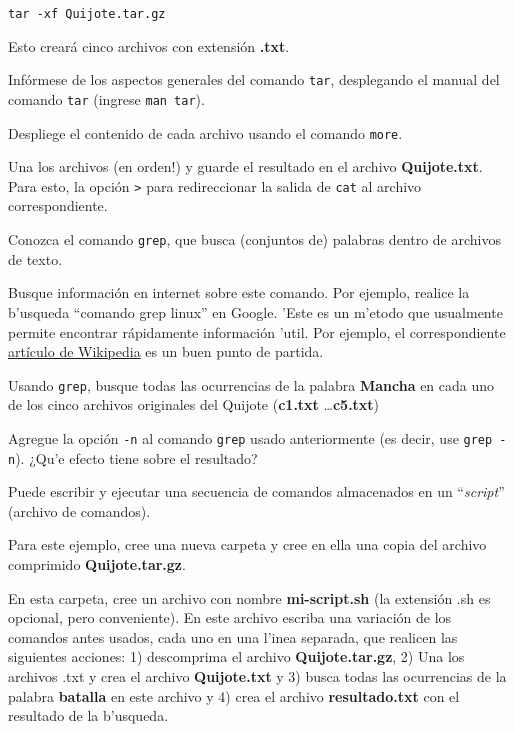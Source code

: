 \documentclass[11pt]{exam}
\begin{document}
\begin{questions}
\begin{parts}
\begin{verbatim}
tar -xf Quijote.tar.gz
\end{verbatim}

Esto creará cinco archivos con extensión \textbf{.txt}. 
\item Infórmese de los aspectos generales del comando \texttt{tar}, desplegando el manual del comando \texttt{tar} (ingrese \texttt{man tar}).
\item Despliege el contenido de cada archivo usando el comando \texttt{more}.
\item Una los archivos (en orden!) y guarde el resultado en el archivo \textbf{Quijote.txt}. Para esto, la opción \texttt{>} para redireccionar la salida de \texttt{cat} al archivo correspondiente.
\end{parts}

\item Conozca el comando \texttt{grep}, que busca (conjuntos de) palabras dentro de archivos de texto. 
\begin{parts}
\item Busque información en internet sobre este comando. Por ejemplo, realice la b'usqueda ``comando grep linux'' en Google. 'Este es un m'etodo que usualmente permite encontrar rápidamente información 'util. Por ejemplo, el correspondiente \href{https://es.wikipedia.org/wiki/Grep}{artículo de Wikipedia} es un buen punto de partida.

\item Usando \texttt{grep}, busque todas las ocurrencias de la palabra \textbf{Mancha} en cada uno de los cinco archivos originales del Quijote (\textbf{c1.txt} \dots \textbf{c5.txt})

\item Agregue la opción \texttt{-n} al comando \texttt{grep} usado anteriormente (es decir, use \texttt{grep -n}). ¿Qu'e efecto tiene sobre el resultado?
\end{parts}

\item Puede escribir y ejecutar una secuencia de comandos almacenados en un ``\textit{script}'' (archivo de comandos).
\begin{parts}
\item Para este ejemplo, cree una nueva carpeta y cree en ella una copia del archivo comprimido \textbf{Quijote.tar.gz}.

\item En esta carpeta, cree un archivo con nombre \textbf{mi-script.sh} (la extensión .sh es opcional, pero conveniente). En este archivo escriba una variación de los  comandos antes usados, cada uno en una l'inea separada, que realicen las siguientes acciones: 1) descomprima el archivo \textbf{Quijote.tar.gz}, 2) Una los archivos .txt y crea el archivo \textbf{Quijote.txt} y 3) busca todas las ocurrencias de la palabra \textbf{batalla} en este archivo y 4) crea el archivo \textbf{resultado.txt} con el resultado de la b'usqueda.


\end{parts}
\end{questions}
\end{document}

